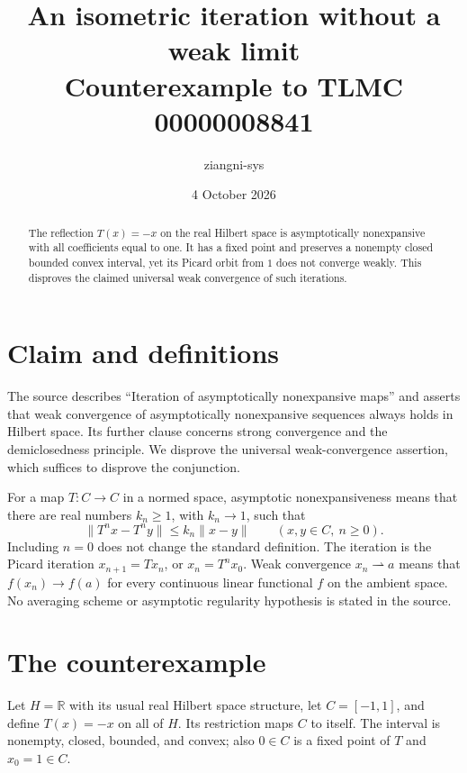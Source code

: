 \documentclass[11pt]{article}
\title{An isometric iteration without a weak limit\\\large Counterexample to TLMC 00000008841}
\author{ziangni-sys}
\date{4 October 2026}
\begin{document}
\maketitle
\begin{abstract}
The reflection $T(x)=-x$ on the real Hilbert space is asymptotically
nonexpansive with all coefficients equal to one. It has a fixed point and
preserves a nonempty closed bounded convex interval, yet its Picard orbit
from $1$ does not converge weakly. This disproves the claimed universal
weak convergence of such iterations.
\end{abstract}

\section{Claim and definitions}
The source describes ``Iteration of asymptotically nonexpansive maps'' and
asserts that weak convergence of asymptotically nonexpansive sequences
always holds in Hilbert space. Its further clause concerns strong
convergence and the demiclosedness principle. We disprove the universal
weak-convergence assertion, which suffices to disprove the conjunction.

For a map $T:C\to C$ in a normed space, asymptotic nonexpansiveness means
that there are real numbers $k_n\geq1$, with $k_n\to1$, such that
\[
 \|T^n x-T^n y\|\leq k_n\|x-y\|
 \qquad(x,y\in C,\ n\geq0).
\]
Including $n=0$ does not change the standard definition. The iteration
is the Picard iteration $x_{n+1}=T x_n$, or $x_n=T^n x_0$.
Weak convergence $x_n\rightharpoonup a$ means that
$f(x_n)\to f(a)$ for every continuous linear functional $f$ on the
ambient space. No averaging scheme or asymptotic regularity hypothesis
is stated in the source.

\section{The counterexample}
Let $H=\mathbb R$ with its usual real Hilbert space structure, let
$C=[-1,1]$, and define $T(x)=-x$ on all of $H$. Its restriction maps
$C$ to itself. The interval is nonempty, closed, bounded, and convex;
also $0\in C$ is a fixed point of $T$ and $x_0=1\in C$.
\end{document}
